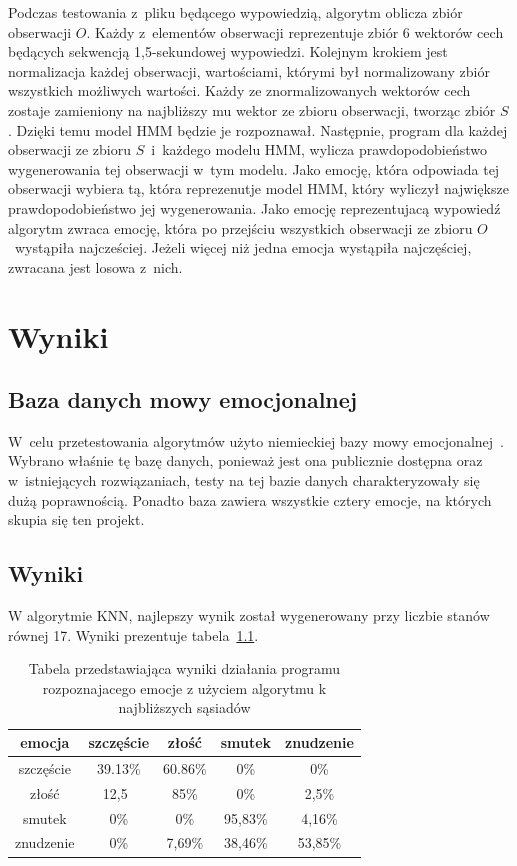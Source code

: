 \documentclass[declaration,shortabstract]{iithesis}
\begin{document}
Podczas testowania z~pliku będącego wypowiedzią, algorytm oblicza zbiór obserwacji $O$. Każdy z~elementów obserwacji reprezentuje zbiór 6 wektorów cech będących sekwencją 1,5-sekundowej wypowiedzi. Kolejnym krokiem jest normalizacja każdej obserwacji, wartościami, którymi był normalizowany zbiór wszystkich możliwych wartości. Każdy ze znormalizowanych wektorów cech zostaje zamieniony na najbliższy mu wektor ze zbioru obserwacji, tworząc zbiór $S$. Dzięki temu model HMM będzie je rozpoznawał. Następnie, program dla każdej obserwacji ze zbioru $S$~i~każdego modelu HMM, wylicza prawdopodobieństwo wygenerowania tej obserwacji w~tym modelu. Jako emocję, która odpowiada tej obserwacji wybiera tą, która reprezenutje model HMM, który wyliczył największe prawdopodobieństwo jej wygenerowania. Jako emocję reprezentujacą wypowiedź algorytm zwraca emocję, która po przejściu wszystkich obserwacji ze zbioru $O$~wystąpiła najcześciej. Jeżeli więcej niż jedna emocja wystąpiła najczęściej, zwracana jest losowa z~nich.

\chapter{Wyniki}
\section{Baza danych mowy emocjonalnej}
W~celu przetestowania algorytmów użyto niemieckiej bazy mowy emocjonalnej~\cite{BDemo}. Wybrano właśnie tę bazę danych, ponieważ jest ona publicznie dostępna oraz w~istniejących rozwiązaniach, testy na tej bazie danych charakteryzowały się dużą poprawnością. Ponadto baza zawiera wszystkie cztery emocje, na których skupia się ten projekt.

\section{Wyniki}
W algorytmie KNN, najlepszy wynik został wygenerowany przy liczbie stanów równej 17. Wyniki prezentuje tabela~\ref{KNN_result}.

\begin{table}[p]
\caption{Tabela przedstawiająca wyniki działania programu rozpoznajacego emocje z użyciem algorytmu k najbliższych sąsiadów}
\begin{center}
  \begin{tabular}{|c|c|c|c|c|}
    \hline
    emocja & szczęście & złość & smutek & znudzenie \\ \hline
    szczęście & 39.13\% & 60.86\% & 0\% & 0\% \\ \hline
	złość & 12,5\ & 85\% & 0\% & 2,5\% \\ \hline
	smutek & 0\% & 0\% & 95,83\% & 4,16\% \\ \hline
	znudzenie & 0\% & 7,69\% & 38,46\% & 53,85\%\\ 
	\hline
  \end{tabular}
  \label{KNN_result}
\end{center}
\end{table}
\end{document}
